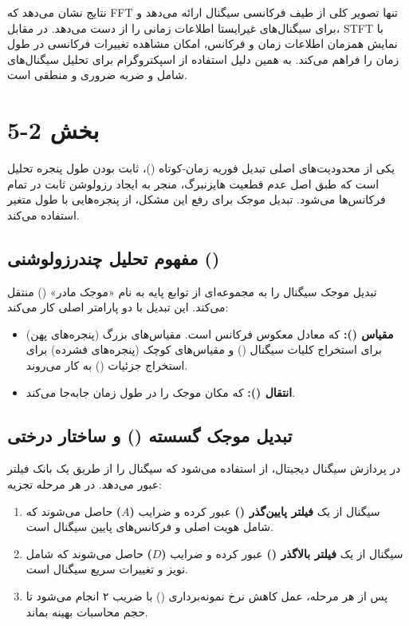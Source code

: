 \documentclass[12pt]{article}
\begin{document}
	نتایج نشان می‌دهد که FFT تنها تصویر کلی از طیف فرکانسی سیگنال ارائه می‌دهد و برای سیگنال‌های غیرایستا اطلاعات زمانی را از دست می‌دهد. در مقابل، STFT با نمایش همزمان اطلاعات زمان و فرکانس، امکان مشاهده تغییرات فرکانسی در طول زمان را فراهم می‌کند. به همین دلیل استفاده از اسپکتروگرام برای تحلیل سیگنال‌های شامل  و ضربه ضروری و منطقی است.
\newpage
	\section{بخش 2-5}
	

	
	یکی از محدودیت‌های اصلی تبدیل فوریه زمان-کوتاه ()، ثابت بودن طول پنجره تحلیل است که طبق اصل عدم قطعیت هایزنبرگ، منجر به ایجاد رزولوشن ثابت در تمام فرکانس‌ها می‌شود. تبدیل موجک برای رفع این مشکل، از پنجره‌هایی با طول متغیر استفاده می‌کند.
	
	\subsection{مفهوم تحلیل چندرزولوشنی ()}
	تبدیل موجک سیگنال را به مجموعه‌ای از توابع پایه به نام «موجک مادر» () منتقل می‌کند. این تبدیل با دو پارامتر اصلی کار می‌کند:
	\begin{itemize}
		\item \textbf{مقیاس ():} که معادل معکوس فرکانس است. مقیاس‌های بزرگ (پنجره‌های پهن) برای استخراج کلیات سیگنال () و مقیاس‌های کوچک (پنجره‌های فشرده) برای استخراج جزئیات () به کار می‌روند.
		\item \textbf{انتقال ():} که مکان موجک را در طول زمان جابه‌جا می‌کند.
	\end{itemize}
	
	\subsection{تبدیل موجک گسسته () و ساختار درختی}
	در پردازش سیگنال دیجیتال، از  استفاده می‌شود که سیگنال را از طریق یک بانک فیلتر عبور می‌دهد. در هر مرحله تجزیه:
	\begin{enumerate}
		\item سیگنال از یک \textbf{فیلتر پایین‌گذر ()} عبور کرده و ضرایب \textbf{ ($A$)} حاصل می‌شوند که شامل هویت اصلی و فرکانس‌های پایین سیگنال است.
		\item سیگنال از یک \textbf{فیلتر بالاگذر ()} عبور کرده و ضرایب \textbf{ ($D$)} حاصل می‌شوند که شامل نویز و تغییرات سریع سیگنال است.
		\item پس از هر مرحله، عمل  کاهش نرخ نمونه‌برداری () با ضریب ۲ انجام می‌شود تا حجم محاسبات بهینه بماند.
	\end{enumerate}
	
\end{document}
